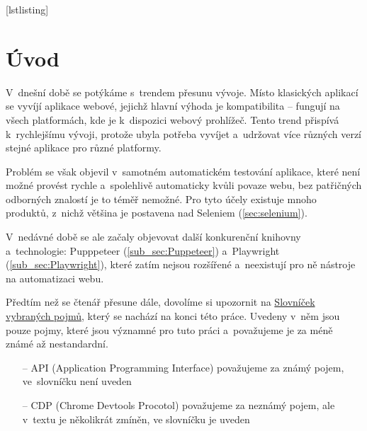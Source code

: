 \documentclass[12pt, a4paper, twoside]{article}
\begin{document}
	
\makeatletter


	[lstlisting]%
	\renewcommand*{\thellabel}{%
		\ifnum\value{llabel}<0 %
		\@ctrerr
		\else
		\ifnum\value{llabel}>10 %
		\@ctrerr
		\else
		\protect\ding{\the\numexpr\value{llabel}+201\relax}%
		\fi
		\fi
	}%

\newlength{\llabelsep}
\setlength{\llabelsep}{5pt}

\newcommand*{\llabel}[1]{%
	\begingroup
	\refstepcounter{llabel}%
	\label{#1}%
	\llap{%
		\thellabel\kern\llabelsep
		\hphantom{\lst@numberstyle\the\lst@lineno}%
		\kern\lst@numbersep
	}%
	\endgroup
}
\makeatother
	
	
	
	
	
	\tableofcontents
	\onehalfspacing
	\newpage
	\printglossary[title=Seznam nestandardních a~méně známých zkratek, toctitle=Seznam nestandardních a~méně známých zkratek, type=\acronymtype]
	\newpage
	\section{Úvod}
	V~dnešní době se potýkáme s~trendem přesunu vývoje. Místo klasických aplikací se vyvíjí aplikace webové, jejichž hlavní výhoda je kompatibilita -- fungují na všech platformách, kde je k~dispozici webový prohlížeč. Tento trend přispívá k~rychlejšímu vývoji, protože ubyla potřeba vyvíjet a~udržovat více různých verzí stejné aplikace pro různé platformy. 
	
	Problém se však objevil v~samotném automatickém testování aplikace, které není možné provést rychle a~spolehlivě automaticky kvůli povaze webu, bez patřičných odborných znalostí je to téměř nemožné. Pro tyto účely existuje mnoho produktů, z~nichž většina je postavena nad Seleniem (\ref{sec:selenium}). 
	
	V~nedávné době se ale začaly objevovat další konkurenční knihovny a~technologie: Pupppeteer (\ref{sub_sec:Puppeteer}) a~Playwright (\ref{sub_sec:Playwright}), které zatím nejsou rozšířené a~neexistují pro ně nástroje na automatizaci webu.
	
	Předtím než se čtenář přesune dále, dovolíme si upozornit na \hyperref[glossary]{Slovníček vybraných pojmů}, který se nachází na konci této práce. Uvedeny v~něm jsou pouze pojmy, které jsou významné pro tuto práci a~považujeme je za méně známé až nestandardní.
	\begin{itemize}
		\item[--] API (Application Programming Interface) považujeme za známý pojem, ve~slovníčku není uveden
		\item[--] CDP (Chrome Devtools Procotol) považujeme za neznámý pojem, ale v~textu je několikrát zmíněn, ve slovníčku je uveden
	\end{itemize}
\end{document}
